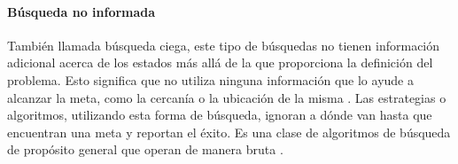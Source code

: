 
\paragraph{Búsqueda no informada}
También llamada búsqueda ciega, este tipo de búsquedas no tienen información adicional acerca de los estados más allá de la que proporciona la definición del problema. Esto significa que no utiliza ninguna información que lo ayude a alcanzar la meta, como la cercanía o la ubicación de la misma . Las estrategias o algoritmos, utilizando esta forma de búsqueda, ignoran a dónde van hasta que encuentran una meta y reportan el éxito. Es una clase de algoritmos de búsqueda de propósito general que operan de manera bruta \cite{Russell2004InteligenciaArtificial,SearchIntelligence,2018SearchTechniques}.
